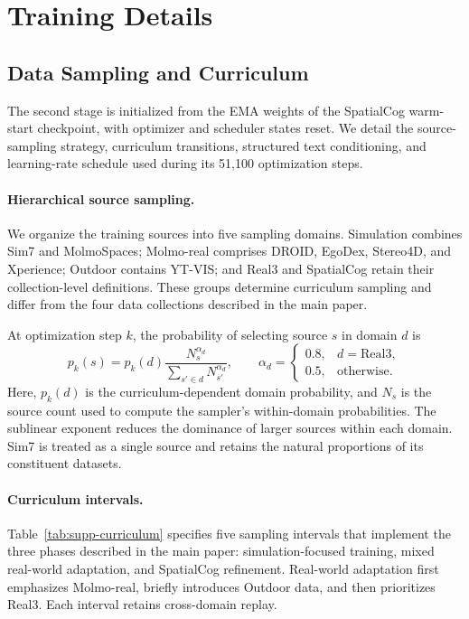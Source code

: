 \section{Training Details}
\label{sec:supp-training}

\subsection{Data Sampling and Curriculum}

The second stage is initialized from the EMA weights of the SpatialCog
warm-start checkpoint, with optimizer and scheduler states reset.
We detail the source-sampling strategy, curriculum transitions, structured
text conditioning, and learning-rate schedule used during its 51,100
optimization steps.

\paragraph{Hierarchical source sampling.}
We organize the training sources into five sampling domains.
Simulation combines Sim7 and MolmoSpaces; Molmo-real comprises DROID,
EgoDex, Stereo4D, and Xperience; Outdoor contains YT-VIS; and Real3 and
SpatialCog retain their collection-level definitions.
These groups determine curriculum sampling and differ from the four
data collections described in the main paper.

At optimization step $k$, the probability of selecting source $s$
in domain $d$ is
\begin{equation}
p_k(s)
=
p_k(d)
\frac{N_s^{\alpha_d}}
{\sum_{s' \in d} N_{s'}^{\alpha_d}},
\qquad
\alpha_d =
\begin{cases}
0.8, & d = \mathrm{Real3}, \\
0.5, & \text{otherwise}.
\end{cases}
\label{eq:supp-source-sampling}
\end{equation}
Here, $p_k(d)$ is the curriculum-dependent domain probability, and $N_s$
is the source count used to compute the sampler's within-domain
probabilities.
The sublinear exponent reduces the dominance of larger sources within
each domain. Sim7 is treated as a single source and retains the natural
proportions of its constituent datasets.

\paragraph{Curriculum intervals.}
Table~\ref{tab:supp-curriculum} specifies five sampling intervals that
implement the three phases described in the main paper: simulation-focused
training, mixed real-world adaptation, and SpatialCog refinement.
Real-world adaptation first emphasizes Molmo-real, briefly introduces
Outdoor data, and then prioritizes Real3. Each interval retains
cross-domain replay.

